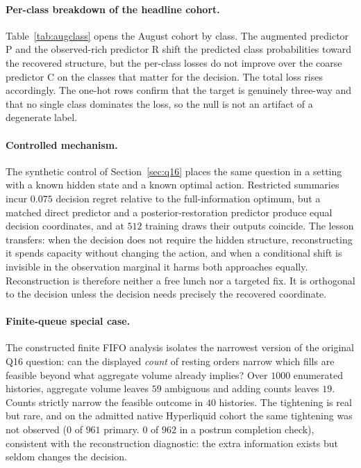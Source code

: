 \paragraph{Per-class breakdown of the headline cohort.} Table~\ref{tab:augclass} opens the
August cohort by class. The augmented predictor P and the observed-rich predictor R shift the
predicted class probabilities toward the recovered structure, but the per-class losses do not
improve over the coarse predictor C on the classes that matter for the decision. The total loss
rises accordingly. The one-hot rows confirm that the target is genuinely three-way and that no
single class dominates the loss, so the null is not an artifact of a degenerate label.



\paragraph{Controlled mechanism.} The synthetic control of Section~\ref{sec:q16} places the
same question in a setting with a known hidden state and a known optimal action. Restricted
summaries incur $0.075$ decision regret relative to the full-information optimum, but a
matched direct predictor and a posterior-restoration predictor produce equal decision
coordinates, and at $512$ training draws their outputs coincide. The lesson transfers: when
the decision does not require the hidden structure, reconstructing it spends capacity
without changing the action, and when a conditional shift is invisible in the observation
marginal it harms both approaches equally. Reconstruction is therefore neither a free lunch
nor a targeted fix. It is orthogonal to the decision unless the decision needs precisely the
recovered coordinate.

\paragraph{Finite-queue special case.} The constructed finite FIFO analysis isolates the
narrowest version of the original Q16 question: can the displayed \emph{count} of resting
orders narrow which fills are feasible beyond what aggregate volume already implies? Over
$1000$ enumerated histories, aggregate volume leaves $59$ ambiguous and adding counts leaves
$19$. Counts strictly narrow the feasible outcome in $40$ histories. The tightening is real
but rare, and on the admitted native Hyperliquid cohort the same tightening was not observed
($0$ of $961$ primary. $0$ of $962$ in a postrun completion check), consistent with the
reconstruction diagnostic: the extra information exists but seldom changes the decision.
